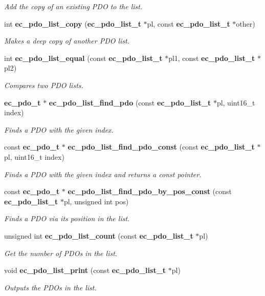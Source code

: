 \begin{DoxyCompactItemize}
\begin{DoxyCompactList}\small\item\em Add the copy of an existing P\-D\-O to the list. \end{DoxyCompactList}\item 
int {\bf ec\-\_\-pdo\-\_\-list\-\_\-copy} ({\bf ec\-\_\-pdo\-\_\-list\-\_\-t} $\ast$pl, const {\bf ec\-\_\-pdo\-\_\-list\-\_\-t} $\ast$other)
\begin{DoxyCompactList}\small\item\em Makes a deep copy of another P\-D\-O list. \end{DoxyCompactList}\item 
int {\bf ec\-\_\-pdo\-\_\-list\-\_\-equal} (const {\bf ec\-\_\-pdo\-\_\-list\-\_\-t} $\ast$pl1, const {\bf ec\-\_\-pdo\-\_\-list\-\_\-t} $\ast$pl2)
\begin{DoxyCompactList}\small\item\em Compares two P\-D\-O lists. \end{DoxyCompactList}\item 
{\bf ec\-\_\-pdo\-\_\-t} $\ast$ {\bf ec\-\_\-pdo\-\_\-list\-\_\-find\-\_\-pdo} (const {\bf ec\-\_\-pdo\-\_\-list\-\_\-t} $\ast$pl, uint16\-\_\-t index)
\begin{DoxyCompactList}\small\item\em Finds a P\-D\-O with the given index. \end{DoxyCompactList}\item 
const {\bf ec\-\_\-pdo\-\_\-t} $\ast$ {\bf ec\-\_\-pdo\-\_\-list\-\_\-find\-\_\-pdo\-\_\-const} (const {\bf ec\-\_\-pdo\-\_\-list\-\_\-t} $\ast$pl, uint16\-\_\-t index)
\begin{DoxyCompactList}\small\item\em Finds a P\-D\-O with the given index and returns a const pointer. \end{DoxyCompactList}\item 
const {\bf ec\-\_\-pdo\-\_\-t} $\ast$ {\bf ec\-\_\-pdo\-\_\-list\-\_\-find\-\_\-pdo\-\_\-by\-\_\-pos\-\_\-const} (const {\bf ec\-\_\-pdo\-\_\-list\-\_\-t} $\ast$pl, unsigned int pos)
\begin{DoxyCompactList}\small\item\em Finds a P\-D\-O via its position in the list. \end{DoxyCompactList}\item 
unsigned int {\bf ec\-\_\-pdo\-\_\-list\-\_\-count} (const {\bf ec\-\_\-pdo\-\_\-list\-\_\-t} $\ast$pl)
\begin{DoxyCompactList}\small\item\em Get the number of P\-D\-Os in the list. \end{DoxyCompactList}\item 
void {\bf ec\-\_\-pdo\-\_\-list\-\_\-print} (const {\bf ec\-\_\-pdo\-\_\-list\-\_\-t} $\ast$pl)
\begin{DoxyCompactList}\small\item\em Outputs the P\-D\-Os in the list. \end{DoxyCompactList}\end{DoxyCompactItemize}


